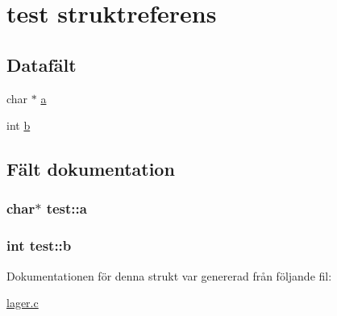 \hypertarget{structtest}{}\section{test struktreferens}
\label{structtest}
\subsection*{Datafält}
\begin{DoxyCompactItemize}
\item 
char $\ast$ \hyperlink{structtest_aad4bcf4a89644c9ad3adc507df7eef15}{a}
\item 
int \hyperlink{structtest_ac52450ad7e71deba8e07a10cfea034ed}{b}
\end{DoxyCompactItemize}


\subsection{Fält dokumentation}
\subsubsection[{\texorpdfstring{a}{a}}]{\setlength{\rightskip}{0pt plus 5cm}char$\ast$ test\+::a}\hypertarget{structtest_aad4bcf4a89644c9ad3adc507df7eef15}{}\label{structtest_aad4bcf4a89644c9ad3adc507df7eef15}
\subsubsection[{\texorpdfstring{b}{b}}]{\setlength{\rightskip}{0pt plus 5cm}int test\+::b}\hypertarget{structtest_ac52450ad7e71deba8e07a10cfea034ed}{}\label{structtest_ac52450ad7e71deba8e07a10cfea034ed}


Dokumentationen för denna strukt var genererad från följande fil\+:\begin{DoxyCompactItemize}
\item 
\hyperlink{lager_8c}{lager.\+c}\end{DoxyCompactItemize}
